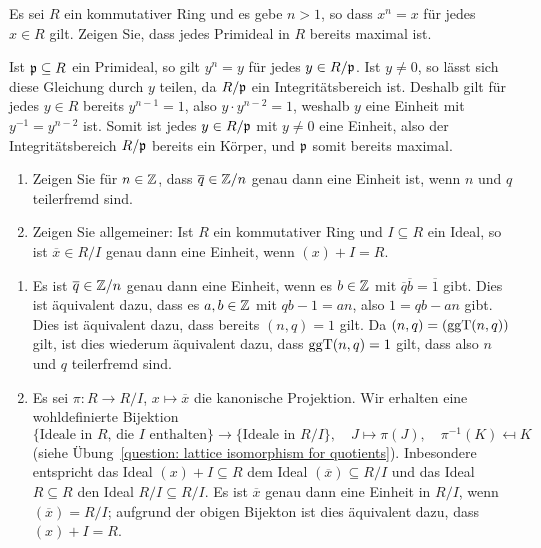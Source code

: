 \begin{question}
  Es sei $R$ ein kommutativer Ring und es gebe $n > 1$, so dass $x^n = x$ für jedes $x \in R$ gilt.
  Zeigen Sie, dass jedes Primideal in $R$ bereits maximal ist.
\end{question}

\begin{solution}
  Ist $\mathfrak{p} \subseteq R$ ein Primideal, so gilt $y^n = y$ für jedes $y \in R/\mathfrak{p}$.
  Ist $y \neq 0$, so lässt sich diese Gleichung durch $y$ teilen, da $R/\mathfrak{p}$ ein Integritätsbereich ist.
  Deshalb gilt für jedes $y \in R$ bereits $y^{n-1} = 1$, also $y \cdot y^{n-2} = 1$, weshalb $y$ eine Einheit mit $y^{-1} = y^{n-2}$ ist.
  Somit ist jedes $y \in R/\mathfrak{p}$ mit $y \neq 0$ eine Einheit, also der Integritätsbereich $R/\mathfrak{p}$ bereits ein Körper, und $\mathfrak{p}$ somit bereits maximal.
\end{solution}


\begin{question}
  \label{question: unit group of quotients}
  \begin{enumerate}
    \item
      Zeigen Sie für $n \in \mathbb{Z}$, dass $\overline{q} \in \mathbb{Z}/n$ genau dann eine Einheit ist, wenn $n$ und $q$ teilerfremd sind.
    \item
      Zeigen Sie allgemeiner:
      Ist $R$ ein kommutativer Ring und $I \subseteq R$ ein Ideal, so ist $\overline{x} \in R/I$ genau dann eine Einheit, wenn $(x) + I = R$.
  \end{enumerate}
\end{question}


\begin{solution}
  \begin{enumerate}
    \item 
      Es ist $\overline{q} \in \mathbb{Z}/n$ genau dann eine Einheit, wenn es $b \in \mathbb{Z}$ mit $\overline{q} \overline{b} = \overline{1}$ gibt.
      Dies ist äquivalent dazu, dass es $a, b \in \mathbb{Z}$ mit $qb - 1 = an$, also $1 = qb - an$ gibt.
      Dies ist äquivalent dazu, dass bereits $(n,q) = 1$ gilt.
      Da $(n,q) = (\operatorname{ggT}(n,q))$ gilt, ist dies wiederum äquivalent dazu, dass $\operatorname{ggT}(n,q) = 1$ gilt, dass also $n$ und $q$ teilerfremd sind.
    \item
      Es sei $\pi \colon R \to R/I$, $x \mapsto \overline{x}$ die kanonische Projektion.
      Wir erhalten eine wohldefinierte Bijektion
      \[
              \{\text{Ideale in $R$, die $I$ enthalten}\}
        \to   \{\text{Ideale in $R/I$}\},
        \quad J \mapsto \pi(J),
        \quad \pi^{-1}(K) \mapsfrom K
      \]
      (siehe Übung~\ref{question: lattice isomorphism for quotients}).
      Inbesondere entspricht das Ideal $(x) + I \subseteq R$ dem Ideal $(\overline{x}) \subseteq R/I$ und das Ideal $R \subseteq R$ den Ideal $R/I \subseteq R/I$.
      Es ist $\overline{x}$ genau dann eine Einheit in $R/I$, wenn $(\overline{x}) = R/I$;
      aufgrund der obigen Bijekton ist dies äquivalent dazu, dass $(x) + I = R$.
  \end{enumerate}
\end{solution}



